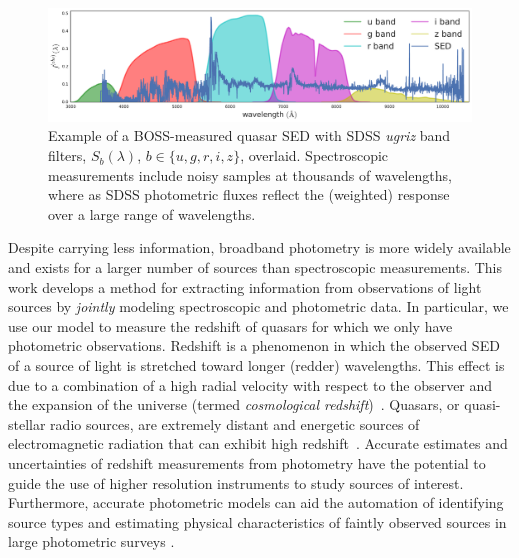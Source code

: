 \documentclass{article}
\begin{document}
\begin{figure}[ht]
\vskip 0in
\begin{center}
\centerline{\includegraphics[width=2\columnwidth]{../figs/quasar_spectrum_sdss_filters}}
\vskip -0.18in
\caption{%
Example of a BOSS-measured quasar SED with SDSS \emph{ugriz} band filters, $S_{b}(\lambda)$, $b \in \{u, g, r, i, z\}$, overlaid.
Spectroscopic measurements include noisy samples at thousands of wavelengths, where as SDSS photometric fluxes reflect the (weighted) response over a large range of wavelengths.}
\label{fig:filters}
\end{center}
\vskip -0.28in
\end{figure} 

Despite carrying less information, broadband photometry is more widely available and exists for a larger number of sources than spectroscopic measurements. 
This work develops a method for extracting information from observations of light sources by \emph{jointly} modeling spectroscopic and photometric data.  
In particular, we use our model to measure the redshift of quasars for which we only have photometric observations.  
Redshift is a phenomenon in which the observed SED of a source of light is stretched toward longer (redder) wavelengths.
This effect is due to a combination of a high radial velocity with respect to the observer and the expansion of the universe (termed \emph{cosmological redshift})~\cite{hogg1999distance, harrison1993redshift}.  
Quasars, or quasi-stellar radio sources, are extremely distant and energetic sources of electromagnetic radiation that can exhibit high redshift~\cite{silk1997quasars}.  
Accurate estimates and uncertainties of redshift measurements from photometry have the potential to guide the use of higher resolution instruments to study sources of interest.  
Furthermore, accurate photometric models can aid the automation of identifying source types and estimating physical characteristics of faintly observed sources in large photometric surveys \cite{regier2015}.  
\end{document}
